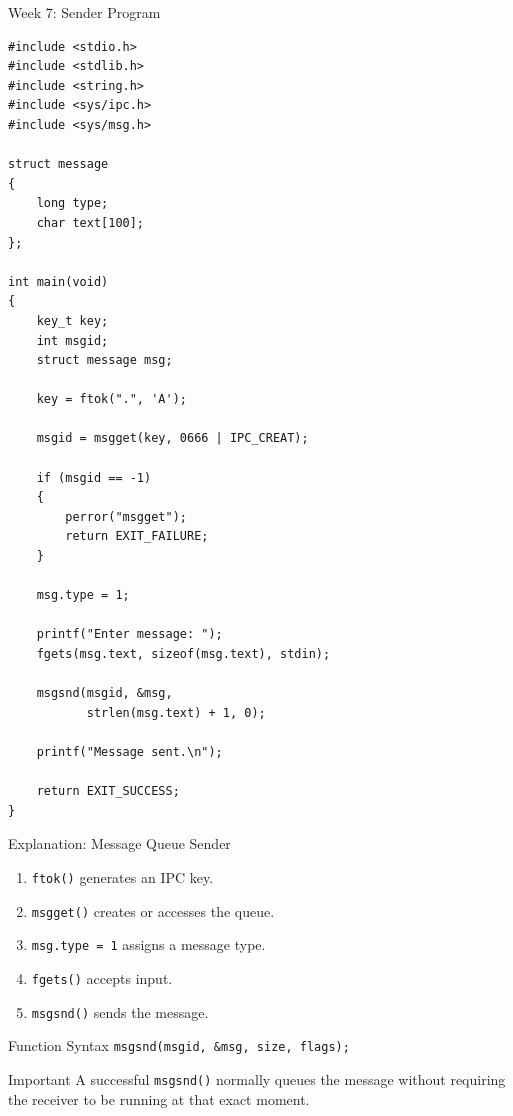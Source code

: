\documentclass[aspectratio=169,10pt]{beamer}
\begin{document}
\begin{frame}[fragile]{Week 7: Sender Program}

\begin{lstlisting}[style=cstyle]
#include <stdio.h>
#include <stdlib.h>
#include <string.h>
#include <sys/ipc.h>
#include <sys/msg.h>

struct message
{
    long type;
    char text[100];
};

int main(void)
{
    key_t key;
    int msgid;
    struct message msg;

    key = ftok(".", 'A');

    msgid = msgget(key, 0666 | IPC_CREAT);

    if (msgid == -1)
    {
        perror("msgget");
        return EXIT_FAILURE;
    }

    msg.type = 1;

    printf("Enter message: ");
    fgets(msg.text, sizeof(msg.text), stdin);

    msgsnd(msgid, &msg,
           strlen(msg.text) + 1, 0);

    printf("Message sent.\n");

    return EXIT_SUCCESS;
}
\end{lstlisting}

\end{frame}

\begin{frame}{Explanation: Message Queue Sender}

\begin{enumerate}
    \item \texttt{ftok()} generates an IPC key.
    \item \texttt{msgget()} creates or accesses the queue.
    \item \texttt{msg.type = 1} assigns a message type.
    \item \texttt{fgets()} accepts input.
    \item \texttt{msgsnd()} sends the message.
\end{enumerate}

\begin{block}{Function Syntax}
\texttt{msgsnd(msgid, \&msg, size, flags);}
\end{block}

\begin{alertblock}{Important}
A successful \texttt{msgsnd()} normally queues
the message without requiring the receiver
to be running at that exact moment.
\end{alertblock}

\end{frame}
\end{document}
